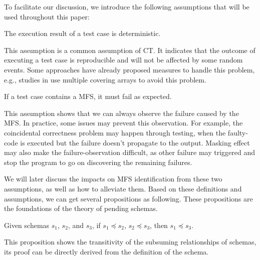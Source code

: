 To facilitate our discussion, we introduce the following assumptions that will be used throughout this paper:

\begin{assumption}  The execution result of a test case is deterministic.
\end{assumption}

This assumption is a common assumption of CT\cite{zhang2011characterizing,ghandehari2012identifying,niu2013identifying}. It indicates that the outcome of executing a test case is reproducible and will not be affected by some random events. Some approaches have already proposed measures to handle this problem, e.g., studies in \cite{yilmaz2006covering,fouche2009incremental} use multiple covering arrays to avoid this problem.

\begin{assumption} If a test case contains a MFS, it must fail as expected.
\end{assumption}

This assumption shows that we can always observe the failure caused by the MFS. In practice, some issues may prevent this observation. For example, the coincidental correctness problem \cite{Masri:2014:PCC:2582050.2559932} may happen through testing, when the faulty-code is executed but the failure doesn't propagate to the output. Masking effect \cite{yilmaz2013reducing} may also make the failure-observation difficult, as other failure may triggered and stop the program to go on discovering the remaining failures.

We will later discuss the impacts on MFS identification from these two assumptions, as well as how to alleviate them. Based on these definitions and assumptions, we can get several propositions as following. These propositions are the foundations of the theory of pending schemas.

\begin{proposition}[Transitive]\label{pro:subsumetrans}
Given schemas $s_{1}$, $s_{2}$, and $s_{3}$, if $s_{1} \preceq s_{2}$, $s_{2} \preceq s_{3}$, then $s_{1} \preceq s_{3}$.
\end{proposition}

This proposition shows the transitivity of the subsuming relationships of schemas, its proof can be directly derived from the definition of the schema.



